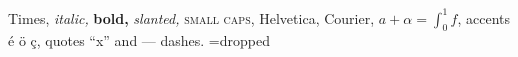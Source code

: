 \documentclass{article}
\begin{document}
Times, {\itshape italic,} {\bfseries bold,} {\slshape slanted,} \textsc{small caps,} {\sffamily Helvetica,}
{\ttfamily Courier,} $a+\alpha=\int_0^1 f$, accents \'e \"o \c{c}, quotes ``x'' and --- dashes.
=\hbox{\selectfont dropped}
\end{document}
